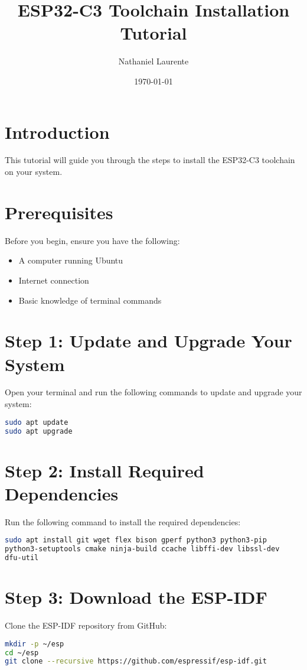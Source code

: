 \documentclass{article}
\title{ESP32-C3 Toolchain Installation Tutorial}
\author{Nathaniel Laurente}
\date{\today}
\begin{document}
\maketitle

\section{Introduction}
This tutorial will guide you through the steps to install the ESP32-C3 toolchain on your system.

\section{Prerequisites}
Before you begin, ensure you have the following:
\begin{itemize}
    \item A computer running Ubuntu
    \item Internet connection
    \item Basic knowledge of terminal commands
\end{itemize}

\section{Step 1: Update and Upgrade Your System}
Open your terminal and run the following commands to update and upgrade your system:
\begin{lstlisting}[language=bash]
sudo apt update
sudo apt upgrade
\end{lstlisting}

\section{Step 2: Install Required Dependencies}
Run the following command to install the required dependencies:
\begin{lstlisting}[language=bash]
sudo apt install git wget flex bison gperf python3 python3-pip 
python3-setuptools cmake ninja-build ccache libffi-dev libssl-dev 
dfu-util
\end{lstlisting}

\section{Step 3: Download the ESP-IDF}
Clone the ESP-IDF repository from GitHub:
\begin{lstlisting}[language=bash]
mkdir -p ~/esp
cd ~/esp
git clone --recursive https://github.com/espressif/esp-idf.git
\end{lstlisting}
\end{document}
